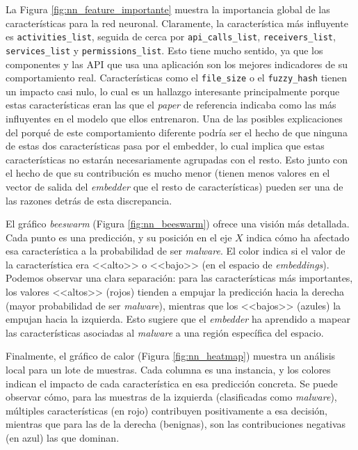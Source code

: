 La Figura \ref{fig:nn_feature_importante} muestra la importancia global de las características para la red neuronal. Claramente, la característica más influyente es \texttt{activities\_list}, seguida de cerca por \texttt{api\_calls\_list}, \texttt{receivers\_list}, \texttt{services\_list} y \texttt{permissions\_list}. Esto tiene mucho sentido, ya que los componentes y las API que usa una aplicación son los mejores indicadores de su comportamiento real. Características como el \texttt{file\_size} o el \texttt{fuzzy\_hash} tienen un impacto casi nulo, lo cual es un hallazgo interesante principalmente porque estas características eran las que el \textit{paper} de referencia indicaba como las más influyentes en el modelo que ellos entrenaron. Una de las posibles explicaciones del porqué de este comportamiento diferente podría ser el hecho de que ninguna de estas dos características pasa por el embedder, lo cual implica que estas características no estarán necesariamente agrupadas con el resto. Esto junto con el hecho de que su contribución es mucho menor (tienen menos valores en el vector de salida del \textit{embedder} que el resto de características) pueden ser una de las razones detrás de esta discrepancia.


El gráfico \textit{beeswarm} (Figura \ref{fig:nn_beeswarm}) ofrece una visión más detallada. Cada punto es una predicción, y su posición en el eje $X$ indica cómo ha afectado esa característica a la probabilidad de ser \textit{malware}. El color indica si el valor de la característica era <<alto>> o <<bajo>> (en el espacio de \textit{embeddings}). Podemos observar una clara separación: para las características más importantes, los valores <<altos>> (rojos) tienden a empujar la predicción hacia la derecha (mayor probabilidad de ser \textit{malware}), mientras que los <<bajos>> (azules) la empujan hacia la izquierda. Esto sugiere que el \textit{embedder} ha aprendido a mapear las características asociadas al \textit{malware} a una región específica del espacio.


Finalmente, el gráfico de calor (Figura \ref{fig:nn_heatmap}) muestra un análisis local para un lote de muestras. Cada columna es una instancia, y los colores indican el impacto de cada característica en esa predicción concreta. Se puede observar cómo, para las muestras de la izquierda (clasificadas como \textit{malware}), múltiples características (en rojo) contribuyen positivamente a esa decisión, mientras que para las de la derecha (benignas), son las contribuciones negativas (en azul) las que dominan.

